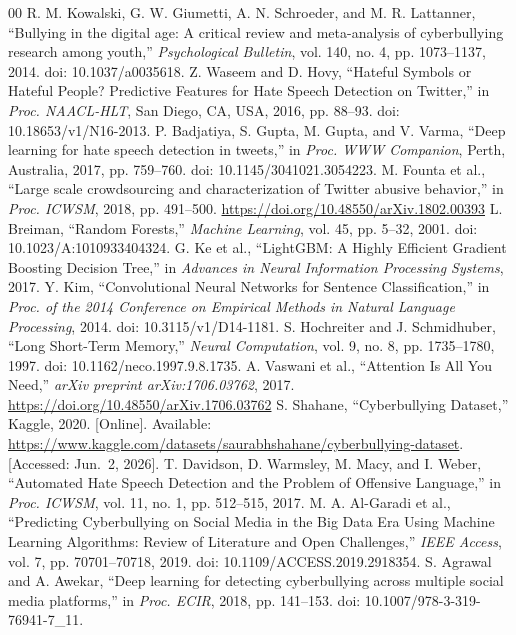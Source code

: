 \documentclass[journal]{IEEEtran}
\begin{document}
\begin{thebibliography}{00}
 R. M. Kowalski, G. W. Giumetti, A. N. Schroeder, and M. R. Lattanner, ``Bullying in the digital age: A critical review and meta-analysis of cyberbullying research among youth,'' \textit{Psychological Bulletin}, vol. 140, no. 4, pp. 1073--1137, 2014. doi: 10.1037/a0035618.
 Z. Waseem and D. Hovy, ``Hateful Symbols or Hateful People? Predictive Features for Hate Speech Detection on Twitter,'' in \textit{Proc. NAACL-HLT}, San Diego, CA, USA, 2016, pp. 88--93. doi: 10.18653/v1/N16-2013.
 P. Badjatiya, S. Gupta, M. Gupta, and V. Varma, ``Deep learning for hate speech detection in tweets,'' in \textit{Proc. WWW Companion}, Perth, Australia, 2017, pp. 759--760. doi: 10.1145/3041021.3054223.
 M. Founta et al., ``Large scale crowdsourcing and characterization of Twitter abusive behavior,'' in \textit{Proc. ICWSM}, 2018, pp. 491--500. \url{https://doi.org/10.48550/arXiv.1802.00393}
 L. Breiman, ``Random Forests,'' \textit{Machine Learning}, vol. 45, pp. 5--32, 2001. doi: 10.1023/A:1010933404324.
 G. Ke et al., ``LightGBM: A Highly Efficient Gradient Boosting Decision Tree,'' in \textit{Advances in Neural Information Processing Systems}, 2017.
 Y. Kim, ``Convolutional Neural Networks for Sentence Classification,'' in \textit{Proc. of the 2014 Conference on Empirical Methods in Natural Language Processing}, 2014. doi: 10.3115/v1/D14-1181.
 S. Hochreiter and J. Schmidhuber, ``Long Short-Term Memory,'' \textit{Neural Computation}, vol. 9, no. 8, pp. 1735--1780, 1997. doi: 10.1162/neco.1997.9.8.1735.
 A. Vaswani et al., ``Attention Is All You Need,'' \textit{arXiv preprint arXiv:1706.03762}, 2017. \url{https://doi.org/10.48550/arXiv.1706.03762}
 S. Shahane, ``Cyberbullying Dataset,'' Kaggle, 2020. [Online]. Available: \url{https://www.kaggle.com/datasets/saurabhshahane/cyberbullying-dataset}. [Accessed: Jun.~2, 2026].
 T. Davidson, D. Warmsley, M. Macy, and I. Weber, ``Automated Hate Speech Detection and the Problem of Offensive Language,'' in \textit{Proc. ICWSM}, vol. 11, no. 1, pp. 512--515, 2017.
 M. A. Al-Garadi et al., ``Predicting Cyberbullying on Social Media in the Big Data Era Using Machine Learning Algorithms: Review of Literature and Open Challenges,'' \textit{IEEE Access}, vol. 7, pp. 70701--70718, 2019. doi: 10.1109/ACCESS.2019.2918354.
 S. Agrawal and A. Awekar, ``Deep learning for detecting cyberbullying across multiple social media platforms,'' in \textit{Proc. ECIR}, 2018, pp. 141--153. doi: 10.1007/978-3-319-76941-7\_11.

\end{thebibliography}
\end{document}
